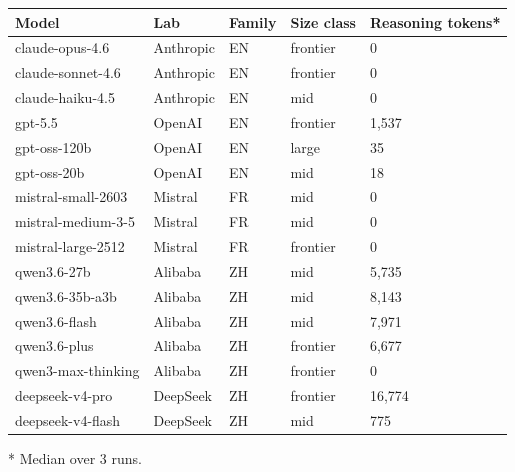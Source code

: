 \documentclass[a4paper,11pt]{article}
\begin{document}
\begin{longtable}[]{@{}lllll@{}}
\toprule\noalign{}
Model & Lab & Family & Size class & Reasoning tokens* \\
\midrule\noalign{}
\endhead
\bottomrule\noalign{}
\endlastfoot
claude-opus-4.6 & Anthropic & EN & frontier & 0 \\
claude-sonnet-4.6 & Anthropic & EN & frontier & 0 \\
claude-haiku-4.5 & Anthropic & EN & mid & 0 \\
gpt-5.5 & OpenAI & EN & frontier & 1,537 \\
gpt-oss-120b & OpenAI & EN & large & 35 \\
gpt-oss-20b & OpenAI & EN & mid & 18 \\
mistral-small-2603 & Mistral & FR & mid & 0 \\
mistral-medium-3-5 & Mistral & FR & mid & 0 \\
mistral-large-2512 & Mistral & FR & frontier & 0 \\
qwen3.6-27b & Alibaba & ZH & mid & 5,735 \\
qwen3.6-35b-a3b & Alibaba & ZH & mid & 8,143 \\
qwen3.6-flash & Alibaba & ZH & mid & 7,971 \\
qwen3.6-plus & Alibaba & ZH & frontier & 6,677 \\
qwen3-max-thinking & Alibaba & ZH & frontier & 0 \\
deepseek-v4-pro & DeepSeek & ZH & frontier & 16,774 \\
deepseek-v4-flash & DeepSeek & ZH & mid & 775 \\
\end{longtable}

* Median over 3 runs.
\end{document}
